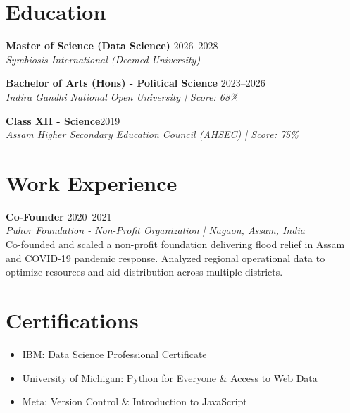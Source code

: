 \documentclass[10pt, a4paper]{article}
\begin{document}
	
	
	\section{Education}
	\noindent\textbf{Master of Science (Data Science)} \hfill 2026--2028\\
	\textit{Symbiosis International (Deemed University)} \vspace{0.5em}
	
	\noindent\textbf{Bachelor of Arts (Hons) - Political Science} \hfill 2023--2026\\
	\textit{Indira Gandhi National Open University | Score: 68\%} \vspace{0.5em}
	
	\noindent\textbf{Class XII - Science}\hfill 2019\\
	\textit{Assam Higher Secondary Education Council (AHSEC) | Score: 75\%} \vspace{0.5em}
	
	
	
	\section{Work Experience}
	\noindent\textbf{Co-Founder} \hfill 2020--2021\\
	\textit{Puhor Foundation - Non-Profit Organization | Nagaon, Assam, India}\\
	Co-founded and scaled a non-profit foundation delivering flood relief in Assam and COVID-19 pandemic response. Analyzed regional operational data to optimize resources and aid distribution across multiple districts.
	
	
	
	\section{Certifications}
	\begin{itemize}[leftmargin=0.15in, topsep=2pt, partopsep=0pt, parsep=0pt, itemsep=2pt, label=\textbullet]
		\item IBM: Data Science Professional Certificate
		\item University of Michigan: Python for Everyone \& Access to Web Data
		\item Meta: Version Control \& Introduction to JavaScript
	\end{itemize}
	
\end{document}
